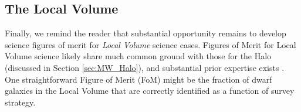 \subsection{The Local Volume}

  Finally, we remind the reader that substantial opportunity
  remains to develop science figures of merit for {\it Local Volume}
  science cases. Figures of Merit for Local Volume science likely
  share much common ground with those for the Halo (discussed in
  Section \ref{sec:MW_Halo}), and substantial prior expertise exists
  \citep[e.g.][]{2014ApJ...795L..13H}. One straightforward Figure of
  Merit (FoM) might be the fraction of dwarf galaxies in the Local
  Volume that are correctly identified as a function of survey
  strategy.


\navigationbar

